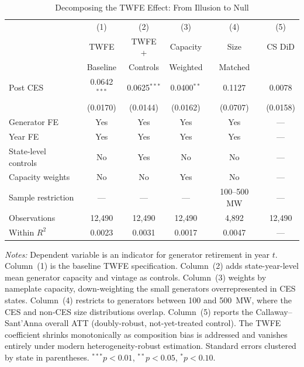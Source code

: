 \begin{table}[t]
\centering
\caption{Decomposing the TWFE Effect: From Illusion to Null}
\label{tab:robustness}
\begin{tabular}{lccccc}
\toprule
 & (1) & (2) & (3) & (4) & (5) \\
 & TWFE & TWFE + & Capacity & Size & CS DiD \\
 & Baseline & Controls & Weighted & Matched & \\
\midrule
Post CES & 0.0642$^{***}$ & 0.0625$^{***}$ & 0.0400$^{**}$ & 0.1127 & 0.0078 \\
 & (0.0170) & (0.0144) & (0.0162) & (0.0707) & (0.0158) \\
[6pt]
\midrule
Generator FE & Yes & Yes & Yes & Yes & --- \\
Year FE & Yes & Yes & Yes & Yes & --- \\
State-level controls & No & Yes & No & No & --- \\
Capacity weights & No & No & Yes & No & --- \\
Sample restriction & --- & --- & --- & 100--500 MW & --- \\
Observations & 12,490 & 12,490 & 12,490 & 4,892 & 12,490 \\
Within $R^2$ & 0.0023 & 0.0031 & 0.0017 & 0.0047 & --- \\
\bottomrule
\end{tabular}
\begin{minipage}{0.92\textwidth}
\vspace{4pt}
\footnotesize
\textit{Notes:} Dependent variable is an indicator for generator retirement in year $t$.
Column~(1) is the baseline TWFE specification. Column~(2) adds state-year-level mean
generator capacity and vintage as controls. Column~(3) weights by nameplate capacity,
down-weighting the small generators overrepresented in CES states. Column~(4) restricts
to generators between 100 and 500~MW, where the CES and non-CES size distributions overlap.
Column~(5) reports the Callaway--Sant'Anna overall ATT (doubly-robust, not-yet-treated control).
The TWFE coefficient shrinks monotonically as composition bias is addressed and vanishes
entirely under modern heterogeneity-robust estimation.
Standard errors clustered by state in parentheses.
$^{***}p<0.01$, $^{**}p<0.05$, $^{*}p<0.10$.
\end{minipage}
\end{table}
